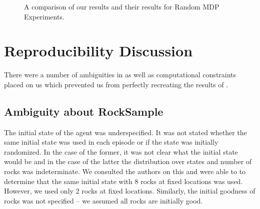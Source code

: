 \documentclass[11pt]{article} %
\begin{document}
\begin{figure}
\centering
{}
\hspace{4mm}
\caption{A comparison of our results and their results for Random MDP Experiments.}
\end{figure}

\section{Reproducibility Discussion}
\label{sec: repDisc}

There were a number of ambiguities in \cite{jiang2015dependence} as well as computational constraints placed on us which prevented us from perfectly recreating the results of \cite{jiang2015dependence}. 

\subsection{Ambiguity about RockSample}
The initial state of the agent was underspecified. It was not stated whether the same initial state was used in each episode or if the state was initially randomized. In the case of the former, it was not clear what the initial state would be and in the case of the latter the distribution over states and number of rocks was indeterminate. We consulted the authors on this and were able to to determine that the same initial state with 8 rocks at fixed locations was used. However, we used only 2 rocks at fixed locations. Similarly, the initial goodness of rocks was not specified -- we assumed all rocks are initially good.
\end{document}

